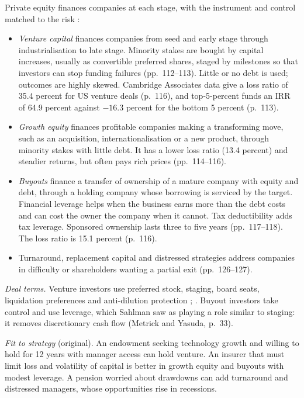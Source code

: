 \begin{qfmethod}\label{meth:private-equity-strategies}
 Private equity finances companies at each stage, with the instrument and control matched to the risk \citep[pp.~58--59, 111--118]{demaria-private-markets-2021}:
\begin{itemize}
\item \emph{Venture capital} finances companies from seed and early stage through industrialisation to late stage. Minority stakes are bought by capital increases, usually as convertible preferred shares, staged by milestones so that investors can stop funding failures (pp.~112--113). Little or no debt is used; outcomes are highly skewed. Cambridge Associates data give a loss ratio of 35.4 percent for US venture deals (p.~116), and top-5-percent funds an IRR of 64.9 percent against $-16.3$ percent for the bottom 5 percent (p.~113).
\item \emph{Growth equity} finances profitable companies making a transforming move, such as an acquisition, internationalisation or a new product, through minority stakes with little debt. It has a lower loss ratio (13.4 percent) and steadier returns, but often pays rich prices (pp.~114--116).
\item \emph{Buyouts} finance a transfer of ownership of a mature company with equity and debt, through a holding company whose borrowing is serviced by the target. Financial leverage helps when the business earns more than the debt costs and can cost the owner the company when it cannot. Tax deductibility adds tax leverage. Sponsored ownership lasts three to five years (pp.~117--118). The loss ratio is 15.1 percent (p.~116).
\item Turnaround, replacement capital and distressed strategies address companies in difficulty or shareholders wanting a partial exit (pp.~126--127).
\end{itemize}

\emph{Deal terms.} Venture investors use preferred stock, staging, board seats, liquidation preferences and anti-dilution protection \citep[pp.~33--34]{metrick-yasuda-survey-2011}; \citep[pp.~167--173]{ippolito-private-capital-2020}. Buyout investors take control and use leverage, which Sahlman saw as playing a role similar to staging: it removes discretionary cash flow (Metrick and Yasuda, p.~33).

 \emph{Fit to strategy} (original). An endowment seeking technology growth and willing to hold for 12 years with manager access can hold venture. An insurer that must limit loss and volatility of capital is better in growth equity and buyouts with modest leverage. A pension worried about drawdowns can add turnaround and distressed managers, whose opportunities rise in recessions.


\end{qfmethod}
